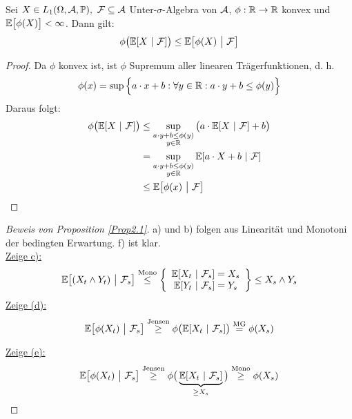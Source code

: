 \begin{lemma}\label{lemma2.2BedingteJensenscheUngleichung}\enter
Sei $X\in L_1(\Omega,\mathcal{A},\mathbb{P}),~\mathcal{F}\subseteq\mathcal{A}$ Unter-$\sigma$-Algebra von $\mathcal{A}$, $\phi:\mathbb{R}\to\mathbb{R}$ konvex und\\ $\mathbb{E}\big[\phi(X)\big]<\infty$. Dann gilt:
\begin{align*}
\phi\big(\mathbb{E}[X~|~\mathcal{F}]\big)\leq\mathbb{E}\big[\phi(X)~\big|~\mathcal{F}\big]
\end{align*}
\end{lemma}
\begin{proof}
Da $\phi$ konvex ist, ist $\phi$ Supremum aller linearen Trägerfunktionen, d. h.
\begin{align*}
\phi(x)=\sup\Big\lbrace a\cdot x+b:\forall y\in \mathbb{R}: a\cdot y+b\leq\phi(y)\Big\rbrace
\end{align*}
Daraus folgt:
\begin{align*}
\phi\big(\mathbb{E}[X~|~\mathcal{F}]\big)
&\leq\sup\limits_{\begin{subarray}{c}a\cdot y+b\leq\phi(y)\\y\in\mathbb{R}\end{subarray}}\big(a\cdot\mathbb{E}[X~|~\mathcal{F}]+b\big) \\
&=\sup\limits_{\begin{subarray}{c}a\cdot y+b\leq\phi(y)\\y\in\mathbb{R}\end{subarray}}
\mathbb{E}[a\cdot X+b~|~\mathcal{F}] \\
&\leq \mathbb{E}\big[\phi(x)~\big|~\mathcal{F}\big]
\end{align*}
\end{proof}

\begin{proof}[Beweis von Proposition \ref{Prop2.1}]\enter
a) und b) folgen aus Linearität und Monotoni der bedingten Erwartung. f) ist klar.\\

\underline{Zeige c):}
\begin{align*}
\mathbb{E}\big[(X_t\wedge Y_t)~\big|~\mathcal{F}_s\big]
\stackrel{\text{Mono}}{\leq}
\left\lbrace\begin{array}{c}
\mathbb{E}[X_t~|~\mathcal{F}_s]=X_s\\
\mathbb{E}[Y_t~|~\mathcal{F}_s]=Y_s\\
\end{array}\right\rbrace
\leq X_s\wedge Y_s
\end{align*}
\underline{Zeige (d):}
\begin{align*}
\mathbb{E}\big[\phi(X_t)~\big|~\mathcal{F}_s\big]
\stackrel{\text{Jensen}}{\geq}
\phi\big(\mathbb{E}[X_t~|~\mathcal{F}_s]\big)
\stackrel{\text{MG}}{=}
\phi(X_s)
\end{align*}

\underline{Zeige (e):}
\begin{align*}
\mathbb{E}\big[\phi(X_t)~\big|~\mathcal{F}_s\big]
\stackrel{\text{Jensen}}{\geq}
\phi\big(\underbrace{\mathbb{E}[X_t~|~\mathcal{F}_s]}_{\geq X_s}\big)
\stackrel{\text{Mono}}{\geq}
\phi(X_s)
\end{align*}
\end{proof}

